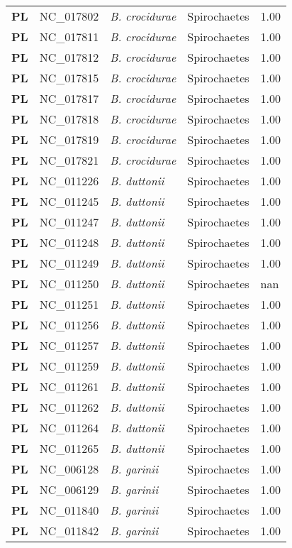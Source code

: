 \begin{adjustwidth}{-3cm}{2cm}
{\begin{supertabular}{>{\bfseries}l|p{0.1\textwidth}p{0.14\textwidth}l|l}
PL & NC\_017802 & \textit{B. crocidurae} & Spirochaetes & 1.00\\
PL & NC\_017811 & \textit{B. crocidurae} & Spirochaetes & 1.00\\
PL & NC\_017812 & \textit{B. crocidurae} & Spirochaetes & 1.00\\
PL & NC\_017815 & \textit{B. crocidurae} & Spirochaetes & 1.00\\
PL & NC\_017817 & \textit{B. crocidurae} & Spirochaetes & 1.00\\
PL & NC\_017818 & \textit{B. crocidurae} & Spirochaetes & 1.00\\
PL & NC\_017819 & \textit{B. crocidurae} & Spirochaetes & 1.00\\
PL & NC\_017821 & \textit{B. crocidurae} & Spirochaetes & 1.00\\
PL & NC\_011226 & \textit{B. duttonii} & Spirochaetes & 1.00\\
PL & NC\_011245 & \textit{B. duttonii} & Spirochaetes & 1.00\\
PL & NC\_011247 & \textit{B. duttonii} & Spirochaetes & 1.00\\
PL & NC\_011248 & \textit{B. duttonii} & Spirochaetes & 1.00\\
PL & NC\_011249 & \textit{B. duttonii} & Spirochaetes & 1.00\\
PL & NC\_011250 & \textit{B. duttonii} & Spirochaetes & nan\\
PL & NC\_011251 & \textit{B. duttonii} & Spirochaetes & 1.00\\
PL & NC\_011256 & \textit{B. duttonii} & Spirochaetes & 1.00\\
PL & NC\_011257 & \textit{B. duttonii} & Spirochaetes & 1.00\\
PL & NC\_011259 & \textit{B. duttonii} & Spirochaetes & 1.00\\
PL & NC\_011261 & \textit{B. duttonii} & Spirochaetes & 1.00\\
PL & NC\_011262 & \textit{B. duttonii} & Spirochaetes & 1.00\\
PL & NC\_011264 & \textit{B. duttonii} & Spirochaetes & 1.00\\
PL & NC\_011265 & \textit{B. duttonii} & Spirochaetes & 1.00\\
PL & NC\_006128 & \textit{B. garinii} & Spirochaetes & 1.00\\
PL & NC\_006129 & \textit{B. garinii} & Spirochaetes & 1.00\\
PL & NC\_011840 & \textit{B. garinii} & Spirochaetes & 1.00\\
PL & NC\_011842 & \textit{B. garinii} & Spirochaetes & 1.00\\

\end{supertabular}}
\end{adjustwidth}
